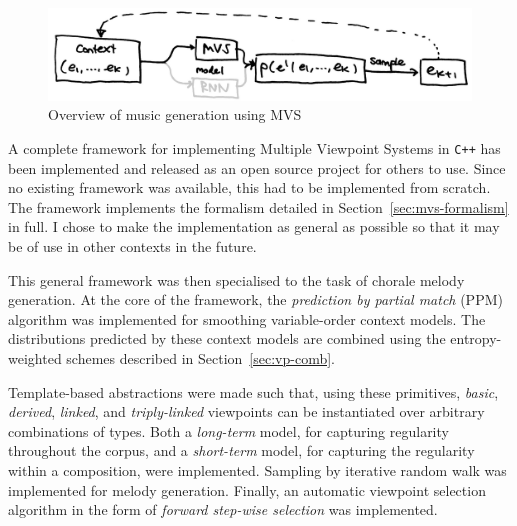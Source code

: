 \documentclass[12pt,a4paper,twoside,openright]{report}
\begin{document}
\begin{figure}[H]
\centering
\includegraphics[width=400pt]{figs/high_level_mvs_tmp.jpg}
\caption{Overview of music generation using MVS}
\label{fig:mvs-gen-overview}
\end{figure}

A complete framework for implementing Multiple Viewpoint Systems in \verb!C++!
has been implemented and released as an open source project for others to use.
Since no existing framework was available, this had to be implemented from
scratch. The framework implements the formalism detailed in
Section~\ref{sec:mvs-formalism} in full. I chose to make the implementation as
general as possible so that it may be of use in other contexts in the future. 

This general framework was then specialised to the task of chorale melody
generation. At the core of the framework, the \emph{prediction by partial match}
(PPM) algorithm was implemented for smoothing variable-order context models. The
distributions predicted by these context models are combined using the
entropy-weighted schemes described in Section~\ref{sec:vp-comb}.

Template-based abstractions were made such that, using these primitives, \emph{basic},
\emph{derived}, \emph{linked}, and \emph{triply-linked} viewpoints can be
instantiated over arbitrary combinations of types. Both a \emph{long-term}
model, for capturing regularity throughout the corpus, and a \emph{short-term}
model, for capturing the regularity within a composition, were implemented.
Sampling by iterative random walk was implemented for melody generation.
Finally, an automatic viewpoint selection algorithm in the form of \emph{forward
step-wise selection} \cite{pearce2005construction} was implemented.
\end{document}
